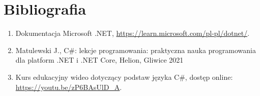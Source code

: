 \documentclass[a4paper,12pt]{report}
\begin{document}
\chapter*{Bibliografia}

\begin{enumerate}
    \item Dokumentacja Microsoft .NET, \url{https://learn.microsoft.com/pl-pl/dotnet/}.
    \item Matulewski J., C#: lekcje programowania: praktyczna nauka programowania dla platform .NET i .NET Core, Helion, Gliwice 2021
    \item  Kurs edukacyjny wideo dotyczący podstaw języka C\#, dostęp online:
\url{https://youtu.be/zP6BAsUlD_A}.
\end{enumerate}
\end{document}

